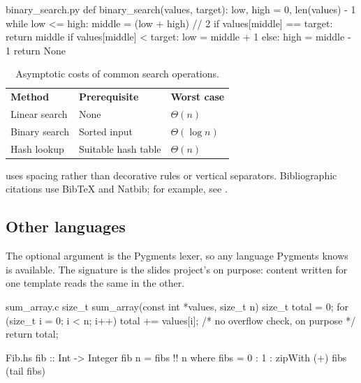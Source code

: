 \documentclass[letterpaper,11pt]{article}
\begin{document}
\begin{codebox}[python]{binary_search.py}
def binary_search(values, target):
    low, high = 0, len(values) - 1
    while low <= high:
        middle = (low + high) // 2
        if values[middle] == target:
            return middle
        if values[middle] < target:
            low = middle + 1
        else:
            high = middle - 1
    return None
\end{codebox}

\par{}
\begin{table}[H]
  \centering
  \caption{Asymptotic costs of common search operations.}
  \label{tab:complexity}
  \begingroup
  \begin{tabular}{@{}lll@{}}
    \textbf{Method} & \textbf{Prerequisite} & \textbf{Worst case} \\[0.35em]
    Linear search & None & $\Theta(n)$ \\
    Binary search & Sorted input & $\Theta(\log n)$ \\
    Hash lookup & Suitable hash table & $\Theta(n)$ \\
  \end{tabular}
  \endgroup
\end{table}
\par{}

 uses spacing rather than decorative rules or vertical separators.
Bibliographic citations use BibTeX and Natbib; for example, see \citet{knuth1984literate}.

\subsection{Other languages}

The optional argument is the Pygments lexer, so any language Pygments knows is available.
The signature is the slides project's on purpose: content written for one template reads the same in the other.

\begin{codebox}[c]{sum_array.c}
size_t sum_array(const int *values, size_t n) {
    size_t total = 0;
    for (size_t i = 0; i < n; i++) {
        total += values[i];  /* no overflow check, on purpose */
    }
    return total;
}
\end{codebox}

\begin{codebox}[haskell]{Fib.hs}
fib :: Int -> Integer
fib n = fibs !! n
  where fibs = 0 : 1 : zipWith (+) fibs (tail fibs)
\end{codebox}
\end{document}

